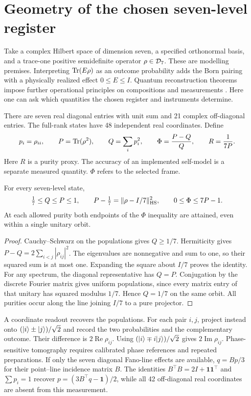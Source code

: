 \section{Geometry of the chosen seven-level register}\label{sec:geometry}
Take a complex Hilbert space of dimension seven, a specified orthonormal basis, and a trace-one positive semidefinite operator $\rho\in\mathcal D_7$. These are modelling premises. Interpreting $\operatorname{Tr}(E\rho)$ as an outcome probability adds the Born pairing with a physically realized effect $0\le E\le I$. Quantum reconstruction theorems impose further operational principles on compositions and measurements \citep{chiribella2011operational}. Here one can ask which quantities the chosen register and instruments determine.

There are seven real diagonal entries with unit sum and 21 complex off-diagonal entries. The full-rank states have 48 independent real coordinates. Define
\begin{equation}
 p_i=\rho_{ii},\qquad P=\operatorname{Tr}(\rho^2),\qquad Q=\sum_i p_i^2,
 \qquad \Phi=\frac{P-Q}{Q},\qquad R=\frac1{7P} .
\label{eq:scores}
\end{equation}
Here $R$ is a purity proxy. The accuracy of an implemented self-model is a separate measured quantity. $\Phi$ refers to the selected frame.

\begin{proposition}\label{prop:geometry}
For every seven-level state,
\[
 \tfrac17\le Q\le P\le1,\qquad
 P-\tfrac17=\|\rho-I/7\|_{\rm HS}^2,\qquad
 0\le\Phi\le7P-1.
\]
At each allowed purity both endpoints of the $\Phi$ inequality are attained, even within a single unitary orbit.
\end{proposition}
\begin{proof}
Cauchy--Schwarz on the populations gives $Q\ge1/7$. Hermiticity gives $P-Q=2\sum_{i<j}|\rho_{ij}|^2$. The eigenvalues are nonnegative and sum to one, so their squared sum is at most one. Expanding the square about $I/7$ proves the identity. For any spectrum, the diagonal representative has $Q=P$. Conjugation by the discrete Fourier matrix gives uniform populations, since every matrix entry of that unitary has squared modulus $1/7$. Hence $Q=1/7$ on the same orbit. All purities occur along the line joining $I/7$ to a pure projector.
\end{proof}

A coordinate readout recovers the populations. For each pair $i,j$, project instead onto $(\lvert i\rangle\pm\lvert j\rangle)/\sqrt2$ and record the two probabilities and the complementary outcome. Their difference is $2\operatorname{Re}\rho_{ij}$. Using $(\lvert i\rangle\mp i\lvert j\rangle)/\sqrt2$ gives $2\operatorname{Im}\rho_{ij}$. Phase-sensitive tomography requires calibrated phase references and repeated preparations. If only the seven diagonal Fano-line effects are available, $q=Bp/3$ for their point--line incidence matrix $B$. The identities $B^\top B=2I+\mathbf 1\mathbf 1^\top$ and $\sum p_i=1$ recover $p=(3B^\top q-\mathbf1)/2$, while all 42 off-diagonal real coordinates are absent from this measurement.

